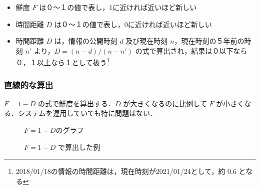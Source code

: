 \begin{itemize}
  \item 鮮度 $F$ は０～１の値で表し，1に近ければ近いほど新しい
  \item 時間距離 $D$ は０～１の値で表し，0に近ければ近いほど新しい
  \item 時間距離 $D$ は，情報の公開時刻 $d$ 及び現在時刻 $n$，現在時刻の５年前の時刻 $n'$ より，$ D =  (n - d) / (n - n') $ の式で算出され，結果は０以下なら０，１以上なら１として扱う\footnote{2018/01/18の情報の時間距離は，現在時刻が2021/01/24として，約 0.6 となる}
\end{itemize}

\subsubsection{直線的な算出}
\label{subsec:linear}

$ F = 1 - D $ の式で鮮度を算出する．$D$ が大きくなるのに比例して $F$ が小さくなる．システムを運用していても特に問題はない．

\begin{figure}[htbp]
  \begin{minipage}{0.5\hsize}
    \begin{center}
    \end{center}
    \caption{$ F = 1 - D $のグラフ}
  \end{minipage}
  \begin{minipage}{0.5\hsize}
    \begin{center}
    \end{center}
    \caption{$ F = 1 - D $ で算出した例}
  \end{minipage}
\end{figure}

